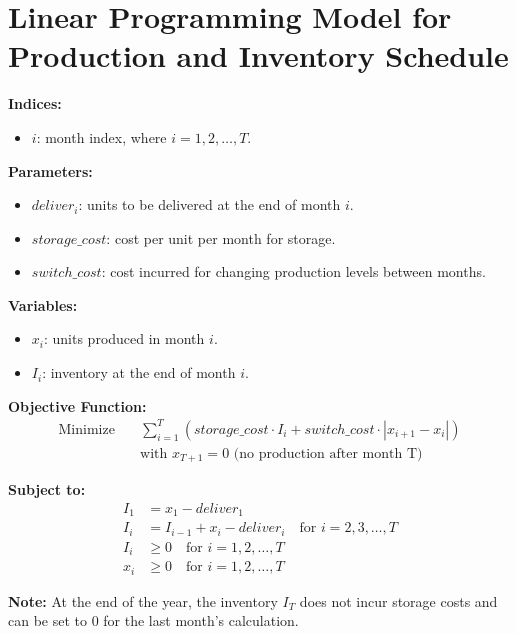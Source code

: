 \documentclass{article}
\begin{document}
\section*{Linear Programming Model for Production and Inventory Schedule}

\textbf{Indices:}
\begin{itemize}
    \item $i$: month index, where $i = 1, 2, \ldots, T$.
\end{itemize}

\textbf{Parameters:}
\begin{itemize}
    \item $deliver_i$: units to be delivered at the end of month $i$.
    \item $storage\_cost$: cost per unit per month for storage.
    \item $switch\_cost$: cost incurred for changing production levels between months.
\end{itemize}

\textbf{Variables:}
\begin{itemize}
    \item $x_i$: units produced in month $i$.
    \item $I_i$: inventory at the end of month $i$.
\end{itemize}

\textbf{Objective Function:}
\begin{align*}
\text{Minimize} \quad & \sum_{i=1}^{T} (storage\_cost \cdot I_i + switch\_cost \cdot |x_{i+1} - x_i|) \\
& \text{with } x_{T+1} = 0 \text{ (no production after month T)}
\end{align*}

\textbf{Subject to:}
\begin{align*}
I_1 &= x_1 - deliver_1 \\
I_i &= I_{i-1} + x_i - deliver_i \quad \text{for } i = 2, 3, \ldots, T \\
I_i &\geq 0 \quad \text{for } i = 1, 2, \ldots, T \\
x_i &\geq 0 \quad \text{for } i = 1, 2, \ldots, T
\end{align*}

\textbf{Note:} 
At the end of the year, the inventory $I_T$ does not incur storage costs and can be set to 0 for the last month's calculation.
\end{document}
